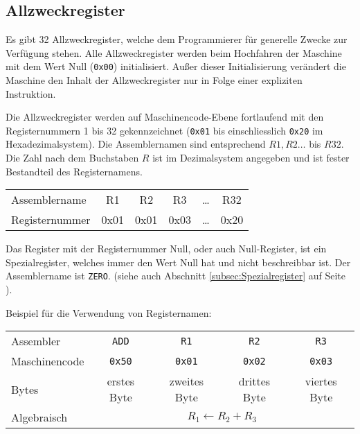 \subsection{Allzweckregister}

Es gibt 32 Allzweckregister, welche dem Programmierer für generelle Zwecke zur
Verfügung stehen. Alle Allzweckregister werden beim Hochfahren der Maschine mit
dem Wert Null (\texttt{0x00}) initialisiert. Außer dieser Initialisierung
verändert die Maschine den Inhalt der Allzweckregister nur in Folge einer
expliziten Instruktion. 

Die Allzweckregister werden auf Maschinencode-Ebene fortlaufend mit den 
Registernummern 1 bis 32 gekennzeichnet (\texttt{0x01} bis einschliesslich
\texttt{0x20} im Hexadezimalsystem). Die Assemblernamen sind entsprechend
$R1, R2\dots$ bis $R32$. Die Zahl nach dem Buchstaben $R$ ist im Dezimalsystem
angegeben und ist fester Bestandteil des Registernamens.

\begin{center}
  \begin{tabular}{l||*{5}{T|}}
    Assemblername  & R1   & R2   & R3   & \dots & R32 \\
    Registernummer & 0x01 & 0x01 & 0x03 & \dots & 0x20
  \end{tabular}
\end{center}

Das Register mit der Registernummer Null, oder auch
Null-Register, ist ein
Spezialregister, welches immer den Wert Null hat und nicht beschreibbar ist.
Der Assemblername ist \texttt{ZERO}. (siehe auch Abschnitt
\ref{subsec:Spezialregister} auf Seite \pageref{subsec:Spezialregister}).

Beispiel für die Verwendung von Registernamen:
\begin{center}
  \begin{tabular}{|l||*{4}{c|}}                                       \hline
    Assembler     & \texttt{ADD}  & \texttt{R1}   & \texttt{R2}   &
                    \texttt{R3}                                      \\
    Maschinencode & \texttt{0x50} & \texttt{0x01} & \texttt{0x02} &
                    \texttt{0x03}                                    \\\hline
    Bytes         & erstes Byte   & zweites Byte  & drittes Byte  & 
                    viertes Byte                                     \\\hline
    Algebraisch   & \multicolumn{4}{c|}{$R_{1} \gets R_{2} + R_{3}$} \\\hline
  \end{tabular}
\end{center}


